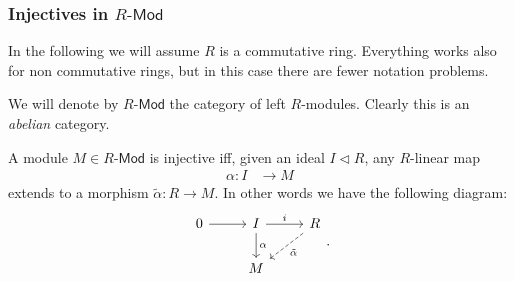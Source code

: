 \documentclass[../Main]{subfiles}
\begin{document}
\subsubsection{Injectives in $R\text{-}\mathsf{Mod}$}
In the following we will assume $R$ is a commutative ring.
Everything works also for non commutative rings, but in this case
there are fewer notation problems.

We will denote by $R\text{-}\mathsf{Mod}$
the category of left $R$-modules.
Clearly this is an {\em abelian} category.

\begin{lem}[Baer]
	A module $M \in R\text{-}\mathsf{Mod}$ is injective iff,
	given an ideal $I \triangleleft R$, any $R$-linear map
	\begin{align}
		\alpha\colon I &\longrightarrow M
	\end{align} 
	extends to a morphism $\tilde{\alpha}\colon R \to M$.
	In other words we have the following diagram:
	\begin{equation}
	\begin{tikzcd}
		0 \arrow[r, "", rightarrow] &
		I \arrow[r, "i", rightarrow] \arrow[d, "\alpha", rightarrow] &
		R \arrow[dl, "\tilde{\alpha}", dashrightarrow] \\
		&
		M &
	\end{tikzcd}
	.\end{equation} 
\end{lem} 
\end{document}
